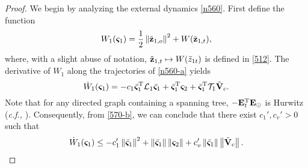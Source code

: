 \begin{proof}
	We begin by analyzing the external dynamics \eqref{n560}.
	First define the function 
	\begin{equation}\label{n587}
	W_1(\bm{\varsigma}_1)=\frac{1}{2}\left\|\tilde{\mathbf{z}}_{1, o}\right\|^2 + W(\tilde{\mathbf{z}}_{1, t}),
	\end{equation}
	where, with a slight abuse of notation, $\tilde{\mathbf{z}}_{1, t} \mapsto W(\tilde z_{1t})$ is defined in \eqref{512}.
	The derivative of $W_1$ along the trajectories of \eqref{n560-a} yields
	\begin{equation}\label{n744}
	\dot W_1(\bm{\varsigma}_1) =-c_1\bar{\bm{\varsigma}}_1^{\mathrm{T}}\mathcal{L}_1\bar{\bm{\varsigma}}_1+\bar{\bm{\varsigma}}_1^{\mathrm{T}}\bm{\varsigma}_2+\bar{\bm{\varsigma}}_1^{\mathrm{T}}\mathcal{T}_1\tilde{\mathbf{V}}_c.
	\end{equation}
	Note that for any directed graph containing a spanning tree, $-\mathbf{E}_t^{\mathrm{T}} \mathbf{E}_\odot$ is Hurwitz (\emph{c.f.,} \cite[Proposition~1]{restrepo_edge-directed_2020}).
	Consequently, from \eqref{570-b}, we can conclude that there exist $c_1', c_v' > 0$ such that
	\begin{equation}\label{n771}
	\dot W_1(\bm{\varsigma}_1) \leq-c_1'\left\|\bar{\bm{\varsigma}}_1\right\|^2+\left\|\bar{\bm{\varsigma}}_1\right\|\left\|\bm{\varsigma}_2\right\|+c_v'\left\|\bar{\bm{\varsigma}}_1\right\|\left\|\tilde{\mathbf{V}}_c\right\|.
	\end{equation}
	

\end{proof}
